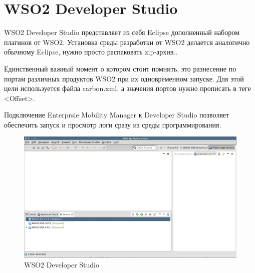 \documentclass[a4paper, 12pt]{article}		%
\begin{document}
\section{WSO2 Developer Studio}

WSO2 Developer Studio представляет из себя Eclipse дополненный набором плагинов от WSO2. Установка среды разработки от WSO2 делается аналогично обычному Eclipse, нужно просто распаковать zip-архив..

Единственный важный момент о котором стоит помнить, это разнесение по портам различных продуктов WSO2 при их одновременном запуске. Для этой цели используется файла carbon.xml, а значения портов нужно прописать в теге <Offset>.

Подключение Enterprsie Mobility Manager к Developer Studio позволяет обеспечить запуск и просмотр логи сразу из среды программирования.

\begin{figure}[h!]
\centering
\includegraphics[scale=0.4]{res/DS001}
\caption{WSO2 Developer Studio}
\end{figure}

\end{document}
